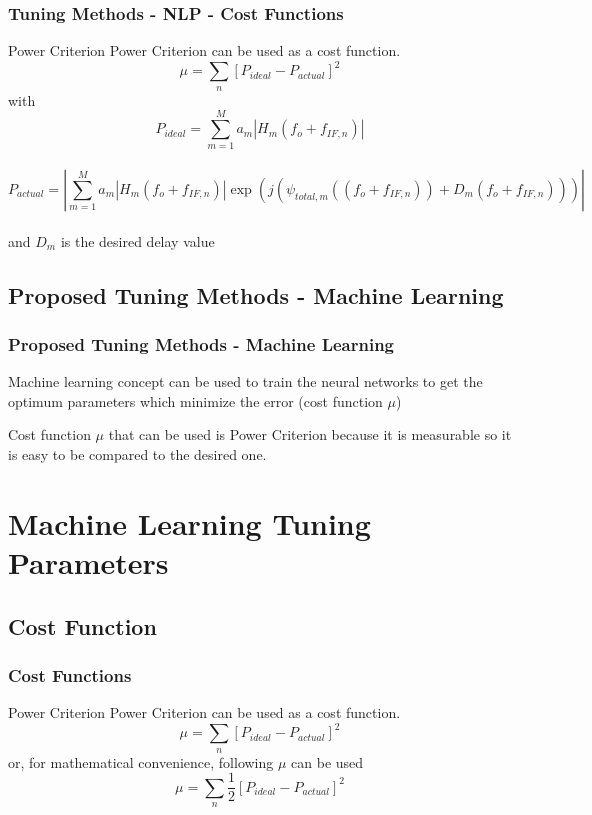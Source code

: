 \documentclass{beamer}
\begin{document}
\begin{frame}\frametitle{Tuning Methods - NLP - Cost Functions}
	\begin{block}{Power Criterion}
	Power Criterion can be used as a cost function.\\
	
	$$
	\mu=\sum_{n}\left [ P_{ideal}-P_{actual}\right ]^2
	$$
	with\\
	$$
	P_{ideal}=\sum_{m=1}^{M}a_m\left | H_m(f_o+f_{IF,n}) \right |
	$$\\
	\footnotesize
	$$
	P_{actual}=\left | \sum_{m=1}^{M}a_m\left | H_m(f_o+f_{IF,n}) \right |\exp(j(\psi_{total,m}((f_o+f_{IF,n}))+D_m(f_o+f_{IF,n}))) \right |
	$$\\
	\normalsize 
	and $D_m$ is the desired delay value
	\end{block}
\end{frame}

\subsection{Proposed Tuning Methods - Machine Learning}

\begin{frame}\frametitle{Proposed Tuning Methods - Machine Learning}
	\begin{definition}
		Machine learning concept can be used to train the neural networks to get the optimum parameters which minimize the error (cost function $\mu$)
		
	\end{definition}
	Cost function $\mu$ that can be used is Power Criterion because it is measurable so it is easy to be compared to the desired one.	
\end{frame}

\section{Machine Learning Tuning Parameters}

\subsection{Cost Function}
	\begin{frame}\frametitle{Cost Functions}
	\begin{block}{Power Criterion}
	Power Criterion can be used as a cost function.\\
	
	$$
	\mu=\sum_{n}\left [ P_{ideal}-P_{actual}\right ]^2
	$$
	or, for mathematical convenience, following $\mu$ can be used\\
	$$
	\mu=\sum_{n}\frac{1}{2}\left [ P_{ideal}-P_{actual}\right ]^2
	$$
	\end{block}
\end{frame}
\end{document}
